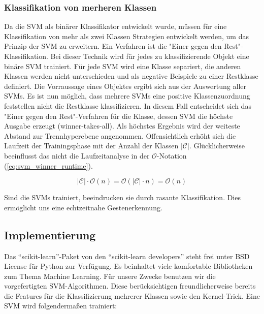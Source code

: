 \newpage

\subsubsection{Klassifikation von merheren Klassen}

Da die SVM als binärer Klassifikator entwickelt wurde, müssen für eine Klassifikation von mehr als zwei Klassen Strategien entwickelt werden, um das Prinzip der SVM zu erweitern. 
Ein Verfahren ist die "{}Einer gegen den Rest"{}-Klassifikation. 
Bei dieser Technik wird für jedes zu klassifizierende Objekt eine binäre SVM trainiert. 
Für jede SVM wird eine Klasse separiert, die anderen Klassen werden nicht unterschieden und als negative Beispiele zu einer Restklasse definiert. 
Die Vorraussage eines Objektes ergibt sich aus der Auswertung aller SVMs. 
Es ist nun möglich, dass mehrere SVMs eine positive Klassenzuordnung feststellen nicht die Restklasse klassifizieren. 
In diesem Fall entscheidet sich das "{}Einer gegen den Rest"{}-Verfahren für die Klasse, dessen SVM die höchste Ausgabe erzeugt (winner-takes-all). 
Als höchstes Ergebnis wird der weiteste Abstand zur Trennhyperebene angenommen. 
Offensichtlich erhöht sich die Laufzeit der Trainingsphase mit der Anzahl der Klassen $|\mathcal{C}|$. 
Glücklicherweise beeinflusst das nicht die Laufzeitanalyse in der $\mathcal{O}$-Notation (\ref{eq:svm_winner_runtime}). 

\begin{equation}
\label{eq:svm_winner_runtime}
    |\mathcal{C}| \cdot \mathcal{O}(n) = \mathcal{O}(|\mathcal{C}| \cdot n) =  \mathcal{O}(n)
\end{equation}

Sind die SVMs trainiert, beeindrucken sie durch rasante Klassifikation. 
Dies ermöglicht uns eine echtzeitnahe Gestenerkennung.


\newpage

\subsection{Implementierung}

Das “scikit-learn”-Paket von den “scikit-learn developers” steht frei unter BSD License für Python zur Verfügung. 
Es beinhaltet viele komfortable Bibliotheken zum Thema Machine Learning. 
Für unsere Zwecke benutzen wir die vorgefertigten SVM-Algorithmen. 
Diese berücksichtigen freundlicherweise bereits die Features für die Klassifizierung mehrerer Klassen sowie den Kernel-Trick. Eine SVM wird folgendermaßen trainiert:

